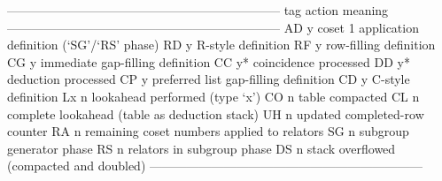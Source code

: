 \begintt
------------------------------------------------------------------
tag   action      meaning
------------------------------------------------------------------
AD         y      coset 1 application definition (`SG'/`RS' phase)
RD         y      R-style definition
RF         y      row-filling definition
CG         y      immediate gap-filling definition
CC         y*     coincidence processed
DD         y*     deduction processed
CP         y      preferred list gap-filling definition
CD         y      C-style definition
Lx         n      lookahead performed (type `x')
CO         n      table compacted
CL         n      complete lookahead (table as deduction stack)
UH         n      updated completed-row counter
RA         n      remaining coset numbers applied to relators
SG         n      subgroup generator phase
RS         n      relators in subgroup phase
DS         n      stack overflowed (compacted and doubled)
------------------------------------------------------------------
\endtt


